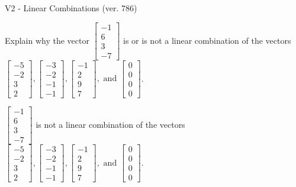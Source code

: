 \begin{exercise}
  \begin{exerciseTitle}V2 - Linear Combinations (ver. 786)\end{exerciseTitle}
  \begin{exerciseStatement}
    Explain why the vector \(\left[\begin{array}{c}
-1 \\
6 \\
3 \\
-7
\end{array}\right]\)  is or is not a linear 
	combination of the vectors \(\left[\begin{array}{c}
-5 \\
-2 \\
3 \\
2
\end{array}\right] , \left[\begin{array}{c}
-3 \\
-2 \\
-1 \\
-1
\end{array}\right] , \left[\begin{array}{c}
-1 \\
2 \\
9 \\
7
\end{array}\right] , \text{ and } \left[\begin{array}{c}
0 \\
0 \\
0 \\
0
\end{array}\right]\).
	


  \end{exerciseStatement}
  \begin{exerciseAnswer}
   \(\left[\begin{array}{c}
-1 \\
6 \\
3 \\
-7
\end{array}\right]\) 
  	 is not  
	a linear combination of the vectors \(\left[\begin{array}{c}
-5 \\
-2 \\
3 \\
2
\end{array}\right] , \left[\begin{array}{c}
-3 \\
-2 \\
-1 \\
-1
\end{array}\right] , \left[\begin{array}{c}
-1 \\
2 \\
9 \\
7
\end{array}\right] , \text{ and } \left[\begin{array}{c}
0 \\
0 \\
0 \\
0
\end{array}\right]\).


\end{exerciseAnswer}
\end{exercise}
